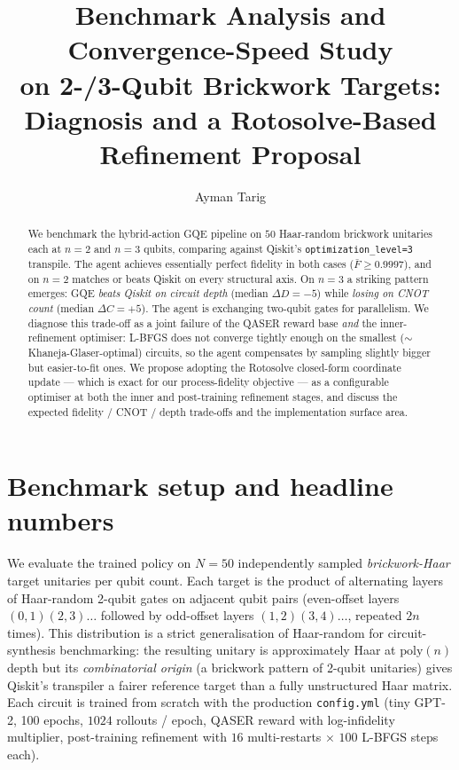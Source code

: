 \documentclass[11pt,a4paper]{article}
\title{\textbf{Benchmark Analysis and Convergence-Speed Study\\
on 2-/3-Qubit Brickwork Targets:\\
Diagnosis and a Rotosolve-Based Refinement Proposal}}
\author{Ayman Tarig}
\date{}
\begin{document}
\maketitle

\begin{abstract}
We benchmark the hybrid-action GQE pipeline on $50$ Haar-random brickwork
unitaries each at $n=2$ and $n=3$ qubits, comparing against Qiskit's
\texttt{optimization\_level=3} transpile. The agent achieves essentially
perfect fidelity in both cases ($\bar F \ge 0.9997$), and on $n=2$ matches
or beats Qiskit on every structural axis. On $n=3$ a striking pattern
emerges: GQE \emph{beats Qiskit on circuit depth} (median $\Delta D = -5$)
while \emph{losing on CNOT count} (median $\Delta C = +5$). The agent is
exchanging two-qubit gates for parallelism. We diagnose this trade-off as
a joint failure of the QASER reward base \emph{and} the inner-refinement
optimiser: L-BFGS does not converge tightly enough on the smallest
($\sim$Khaneja-Glaser-optimal) circuits, so the agent compensates by
sampling slightly bigger but easier-to-fit ones. We propose adopting
the Rotosolve closed-form coordinate update --- which is exact for our
process-fidelity objective --- as a configurable optimiser at both the
inner and post-training refinement stages, and discuss the expected
fidelity / CNOT / depth trade-offs and the implementation surface area.
\end{abstract}

\section{Benchmark setup and headline numbers}

We evaluate the trained policy on $N = 50$ independently sampled
\emph{brickwork-Haar} target unitaries per qubit count. Each target is the
product of alternating layers of Haar-random 2-qubit gates on adjacent
qubit pairs (even-offset layers $(0,1)(2,3)\ldots$ followed by odd-offset
layers $(1,2)(3,4)\ldots$, repeated $2n$ times). This distribution is a
strict generalisation of Haar-random for circuit-synthesis benchmarking:
the resulting unitary is approximately Haar at $\mathrm{poly}(n)$ depth
but its \emph{combinatorial origin} (a brickwork pattern of 2-qubit
unitaries) gives Qiskit's transpiler a fairer reference target than a
fully unstructured Haar matrix. Each circuit is trained from scratch with
the production \texttt{config.yml} (tiny GPT-2, 100 epochs, $1024$ rollouts
/ epoch, QASER reward with log-infidelity multiplier, post-training
refinement with $16$ multi-restarts $\times$ $100$ L-BFGS steps each).
\end{document}
